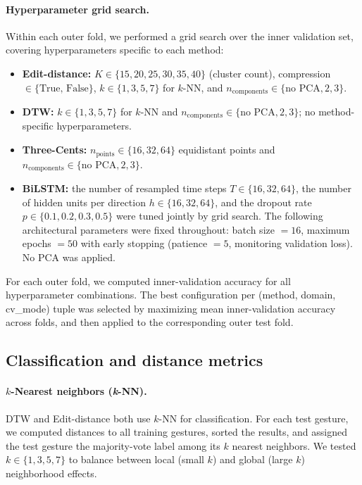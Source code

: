 \paragraph{Hyperparameter grid search.} Within each outer fold, we performed a
grid search over the inner validation set, covering hyperparameters specific to
each method:

\begin{itemize}\itemsep 0em
    \item \textbf{Edit-distance:} $K \in \{15, 20, 25, 30, 35, 40\}$
    (cluster count), compression $\in \{\text{True, False}\}$,
    $k \in \{1, 3, 5, 7\}$ for $k$-NN, and
    $n_{\text{components}} \in \{\text{no PCA}, 2, 3\}$.

    \item \textbf{DTW:} $k \in \{1, 3, 5, 7\}$ for $k$-NN and
    $n_{\text{components}} \in \{\text{no PCA}, 2, 3\}$;
    no method-specific hyperparameters.

    \item \textbf{Three-Cents:} $n_{\text{points}} \in \{16, 32, 64\}$
    equidistant points and
    $n_{\text{components}} \in \{\text{no PCA}, 2, 3\}$.

    \item \textbf{BiLSTM:} the number of resampled time steps
    $T \in \{16, 32, 64\}$, the number of hidden units per direction
    $h \in \{16, 32, 64\}$, and the dropout rate
    $p \in \{0.1, 0.2, 0.3, 0.5\}$ were tuned jointly by grid search.
    The following architectural parameters were fixed throughout:
    batch size $= 16$, maximum epochs $= 50$ with early stopping
    (patience $= 5$, monitoring validation loss). No PCA was applied.
\end{itemize}

For each outer fold, we computed inner-validation accuracy for all
hyperparameter combinations. The best configuration per
(method, domain, cv\_mode) tuple was selected by maximizing mean inner-validation
accuracy across folds, and then applied to the corresponding outer test fold.
 
\subsection{Classification and distance metrics}
 
\paragraph{$k$-Nearest neighbors (\textit{k}-NN).} DTW and Edit-distance both use
$k$-NN for classification. For each test gesture, we computed distances to all
training gestures, sorted the results, and assigned the test gesture the
majority-vote label among its $k$ nearest neighbors. We tested $k \in \{1, 3,
5, 7\}$ to balance between local (small $k$) and global (large $k$)
neighborhood effects.
 
